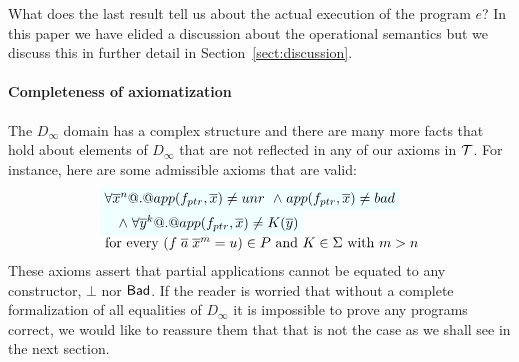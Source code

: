 What does the last result tell us about the actual execution of the program $e$? In this
paper we have elided a discussion about the operational semantics but we discuss this
in further detail in Section~\ref{sect:discussion}.

\paragraph{Completeness of axiomatization} 

The $D_\infty$ domain has a complex structure and there are many more facts that 
hold about elements of $D_\infty$ that are not reflected in any of our axioms in ${\cal T}$. 
For instance, here are some admissible axioms that are valid: 
\[\begin{array}{l}
    \formula{\forall \oln{x}{n} @.@ app(f_{ptr},\xs) \neq \unr} 
    \formula{\land\; app(f_{ptr},\xs) \neq \bad} \\
    \formula{\quad\land\; \forall \oln{y}{k} @.@ app(f_{ptr},\xs) \neq K(\ol{y})} \\
    \text{ for every } (f\;\ol{a}\;\oln{x}{m} = u) \in P  
    \text{ and } K \in \Sigma \text{ with } m > n
\end{array}\]
These axioms assert that partial applications cannot be equated to 
any constructor, $\bot$ nor $\mathsf{Bad}$. If the reader is worried that without a 
complete formalization of all equalities of $D_\infty$ it is impossible to prove any 
programs correct, we would like to reassure them that that is not the case as we 
shall see in the next section.









